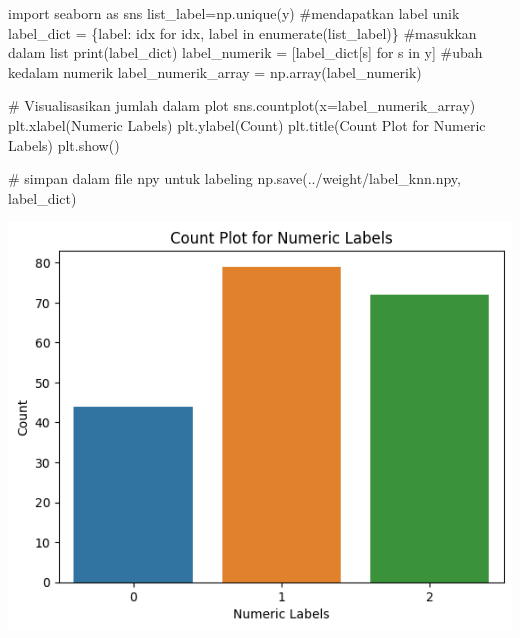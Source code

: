 \documentclass[
  letterpaper,
  DIV=11,
  numbers=noendperiod]{scrreprt}
\newenvironment{Shaded}{\begin{snugshade}}{\end{snugshade}}
\newcommand{\BuiltInTok}[1]{\textcolor[rgb]{0.00,0.23,0.31}{#1}}
\newcommand{\CommentTok}[1]{\textcolor[rgb]{0.37,0.37,0.37}{#1}}
\newcommand{\ControlFlowTok}[1]{\textcolor[rgb]{0.00,0.23,0.31}{#1}}
\newcommand{\ImportTok}[1]{\textcolor[rgb]{0.00,0.46,0.62}{#1}}
\newcommand{\KeywordTok}[1]{\textcolor[rgb]{0.00,0.23,0.31}{#1}}
\newcommand{\NormalTok}[1]{\textcolor[rgb]{0.00,0.23,0.31}{#1}}
\newcommand{\OperatorTok}[1]{\textcolor[rgb]{0.37,0.37,0.37}{#1}}
\newcommand{\StringTok}[1]{\textcolor[rgb]{0.13,0.47,0.30}{#1}}
\begin{document}
\begin{Shaded}
\begin{Highlighting}[]
\ImportTok{import}\NormalTok{ seaborn }\ImportTok{as}\NormalTok{ sns}
\NormalTok{list\_label}\OperatorTok{=}\NormalTok{np.unique(y) }\CommentTok{\#mendapatkan label unik}
\NormalTok{label\_dict }\OperatorTok{=}\NormalTok{ \{label: idx }\ControlFlowTok{for}\NormalTok{ idx, label }\KeywordTok{in} \BuiltInTok{enumerate}\NormalTok{(list\_label)\} }\CommentTok{\#masukkan dalam list}
\BuiltInTok{print}\NormalTok{(label\_dict)}
\NormalTok{label\_numerik }\OperatorTok{=}\NormalTok{ [label\_dict[s] }\ControlFlowTok{for}\NormalTok{ s }\KeywordTok{in}\NormalTok{ y] }\CommentTok{\#ubah kedalam numerik}
\NormalTok{label\_numerik\_array }\OperatorTok{=}\NormalTok{ np.array(label\_numerik)}

\CommentTok{\# Visualisasikan jumlah dalam plot}
\NormalTok{sns.countplot(x}\OperatorTok{=}\NormalTok{label\_numerik\_array)}
\NormalTok{plt.xlabel(}\StringTok{\textquotesingle{}Numeric Labels\textquotesingle{}}\NormalTok{)}
\NormalTok{plt.ylabel(}\StringTok{\textquotesingle{}Count\textquotesingle{}}\NormalTok{)}
\NormalTok{plt.title(}\StringTok{\textquotesingle{}Count Plot for Numeric Labels\textquotesingle{}}\NormalTok{)}
\NormalTok{plt.show()  }

\CommentTok{\# simpan dalam file npy untuk labeling}
\NormalTok{np.save(}\StringTok{\textquotesingle{}../weight/label\_knn.npy\textquotesingle{}}\NormalTok{, label\_dict)}
\end{Highlighting}
\end{Shaded}

\includegraphics{Asset/plothaarknn.png}
\end{document}
